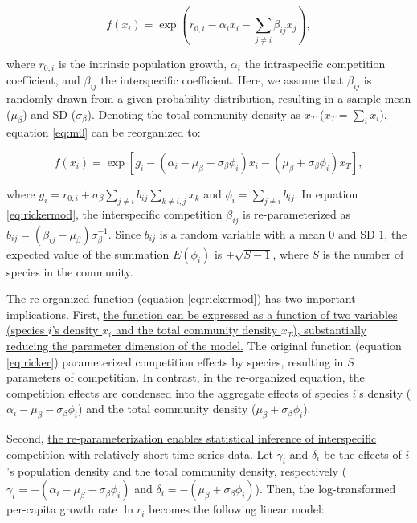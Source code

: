 \documentclass[12pt, class=article, crop=false]{standalone}
\begin{document}
\begin{equation}
\label{eq:ricker}
f(x_{i}) = \exp(r_{0,i} - \alpha_i x_i - \sum_{j \ne i} \beta_{ij} x_{j}),
\end{equation}

where $r_{0,i}$ is the intrinsic population growth, $\alpha_{i}$ the intraspecific competition coefficient, and $\beta_{ij}$ the interspecific coefficient.
Here, we assume that $\beta_{ij}$ is randomly drawn from a given probability distribution, resulting in a sample mean ($\mu_{\beta}$) and SD ($\sigma_{\beta}$). 
Denoting the total community density as $x_T$ ($x_T = \sum_i x_i$), equation \ref{eq:m0} can be reorganized to:

\begin{equation}
\label{eq:rickermod}
f(x_i) = \exp\left[g_i - (\alpha_i - \mu_{\beta} - \sigma_{\beta} \phi_i) x_i - (\mu_{\beta} + \sigma_{\beta} \phi_i) x_T \right],
\end{equation}

where $g_i = r_{0,i} + \sigma_{\beta} \sum_{j \ne i} b_{ij} \sum_{k \ne i, j} x_{k}$ and $\phi_i = \sum_{j \ne i} b_{ij}$.
In equation \ref{eq:rickermod}, the interspecific competition $\beta_{ij}$ is re-parameterized as $b_{ij} = (\beta_{ij} - \mu_{\beta}) \sigma_{\beta}^{-1}$. Since $b_{ij}$ is a random variable with a mean $0$ and SD $1$, the expected value of the summation $E(\phi_i)$ is $\pm \sqrt{S - 1}$, where $S$ is the number of species in the community.

The re-organized function (equation \ref{eq:rickermod}) has two important implications. First, \ul{the function can be expressed as a function of two variables (species $i$'s density $x_i$ and the total community density $x_T$), substantially reducing the parameter dimension of the model.} The original function (equation \ref{eq:ricker}) parameterized competition effects by species, resulting in $S$ parameters of competition. In contrast, in the re-organized equation, the competition effects are condensed into the aggregate effects of species $i$'s density ($\alpha_i - \mu_{\beta} - \sigma_{\beta} \phi_i$) and the total community density ($\mu_{\beta} + \sigma_{\beta} \phi_i$).

Second, \ul{the re-parameterization enables statistical inference of interspecific competition with relatively short time series data}. Let $\gamma_i$ and $\delta_i$ be the effects of $i$'s population density and the total community density, respectively ($\gamma_i = -(\alpha_i - \mu_{\beta} - \sigma_{\beta} \phi_i)$ and $\delta_i = -(\mu_{\beta} + \sigma_{\beta} \phi_i)$). Then, the log-transformed per-capita growth rate $\ln r_i$ becomes the following linear model:
\end{document}
